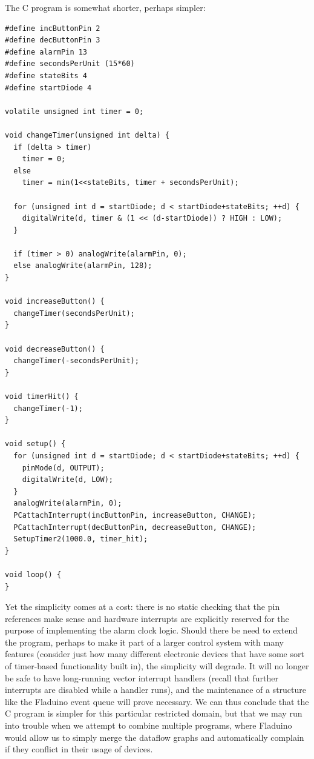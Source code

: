 \documentclass[a4paper, oneside, final]{memoir}
\begin{document}
\newpage
\noindent
The C program is somewhat shorter, perhaps simpler:

\begin{verbatim}
#define incButtonPin 2
#define decButtonPin 3
#define alarmPin 13
#define secondsPerUnit (15*60)
#define stateBits 4
#define startDiode 4

volatile unsigned int timer = 0;

void changeTimer(unsigned int delta) {
  if (delta > timer)
    timer = 0;
  else
    timer = min(1<<stateBits, timer + secondsPerUnit);
  
  for (unsigned int d = startDiode; d < startDiode+stateBits; ++d) {
    digitalWrite(d, timer & (1 << (d-startDiode)) ? HIGH : LOW);
  }

  if (timer > 0) analogWrite(alarmPin, 0);
  else analogWrite(alarmPin, 128);
}

void increaseButton() {
  changeTimer(secondsPerUnit);
}

void decreaseButton() {
  changeTimer(-secondsPerUnit);
}

void timerHit() {
  changeTimer(-1);
}

void setup() {
  for (unsigned int d = startDiode; d < startDiode+stateBits; ++d) {
    pinMode(d, OUTPUT);
    digitalWrite(d, LOW);
  }
  analogWrite(alarmPin, 0);
  PCattachInterrupt(incButtonPin, increaseButton, CHANGE);
  PCattachInterrupt(decButtonPin, decreaseButton, CHANGE);
  SetupTimer2(1000.0, timer_hit);
}

void loop() {
}
\end{verbatim}

Yet the simplicity comes at a cost: there is no static checking that
the pin references make sense and hardware interrupts are explicitly
reserved for the purpose of implementing the alarm clock logic.
Should there be need to extend the program, perhaps to make it part of
a larger control system with many features (consider just how many
different electronic devices that have some sort of timer-based
functionality built in), the simplicity will degrade.  It will no
longer be safe to have long-running vector interrupt handlers (recall
that further interrupts are disabled while a handler runs), and the
maintenance of a structure like the Fladuino event queue will prove
necessary.  We can thus conclude that the C program is simpler for
this particular restricted domain, but that we may run into trouble
when we attempt to combine multiple programs, where Fladuino would
allow us to simply merge the dataflow graphs and automatically
complain if they conflict in their usage of devices.
\end{document}
